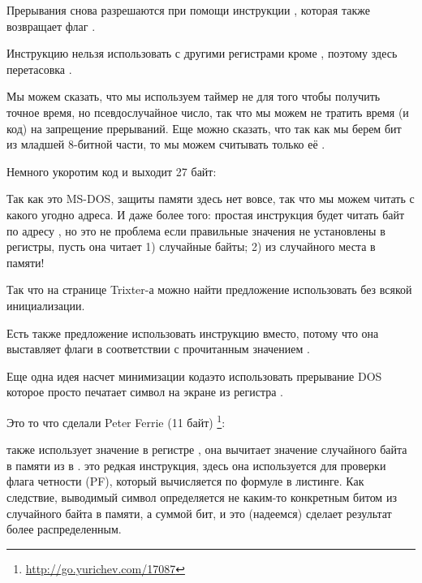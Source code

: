 Прерывания снова разрешаются при помощи инструкции , которая
также возвращает флаг .

Инструкцию  нельзя использовать с другими регистрами кроме , поэтому здесь перетасовка
.


Мы можем сказать, что мы используем таймер не для того чтобы получить точное время, но псевдослучайное число,
так что мы можем не тратить время (и код) на запрещение прерываний.
Еще можно сказать, что так как мы берем бит из младшей 8-битной части, то мы можем считывать только её
.

Немного укоротим код и выходит 27 байт:




Так как это MS-DOS, защиты памяти здесь нет вовсе, так что мы можем читать с какого
угодно адреса.
И даже более того: простая инструкция  
будет читать байт по адресу , но это не проблема
если правильные значения не установлены в регистры, пусть она читает 1) случайные байты; 2) из случайного
места в памяти!

Так что на странице Trixter-а\FNURLTRIXTER 
можно найти предложение использовать  без всякой инициализации.

Есть также предложение использовать инструкцию  
вместо, потому что она выставляет флаги в соответствии с прочитанным значением
.

Еще одна идея насчет минимизации кода\EMDASH{}это использовать прерывание DOS
  которое просто печатает символ на экране
из регистра .

Это то что сделали Peter Ferrie \AndENRU \HERMIT{} (11  байт)
\footnote{\url{http://go.yurichev.com/17087}}:



 также использует значение в регистре , она вычитает значение
случайного байта в памяти из
  в .
 это редкая инструкция, здесь она используется для проверки флага четности (PF),
который вычисляется по формуле в листинге.
Как следствие, выводимый символ определяется не каким-то конкретным битом из случайного байта в памяти,
а суммой бит, и это (надеемся) сделает результат более распределенным.

